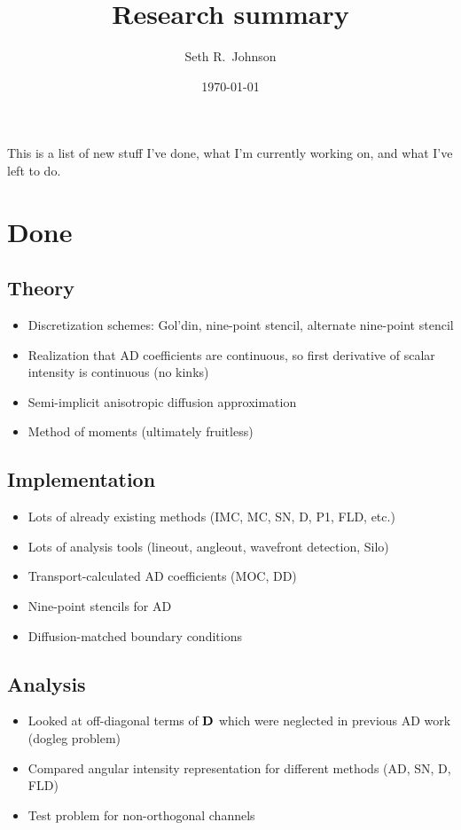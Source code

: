 \documentclass[11pt]{SRJresearch}
\author{Seth R.~Johnson}
\date{\today}
\title{Research summary}
\newcommand{\Dtens}{\mat{D}}
\begin{document}
This is a list of new stuff I've done, what I'm currently working on, and what
I've left to do.

\section{Done}
\subsection{Theory}
\begin{itemize}
  \item Discretization schemes: Gol'din, nine-point stencil, alternate
    nine-point stencil
  \item Realization that AD coefficients are continuous, so first derivative of
    scalar intensity is continuous (no kinks)
  \item Semi-implicit anisotropic diffusion approximation
  \item Method of moments (ultimately fruitless)
\end{itemize}

\subsection{Implementation}
\begin{itemize}
  \item Lots of already existing methods (IMC, MC, SN, D, P1, FLD, etc.)
  \item Lots of analysis tools (lineout, angleout, wavefront detection, Silo)
  \item Transport-calculated AD coefficients (MOC, DD)
  \item Nine-point stencils for AD
  \item Diffusion-matched boundary conditions
\end{itemize}

\subsection{Analysis}
\begin{itemize}
  \item Looked at off-diagonal terms of $\Dtens$ which were neglected in
    previous AD work (dogleg problem)
  \item Compared angular intensity representation for different methods (AD,
    SN, D, FLD)
  \item Test problem for non-orthogonal channels
\end{itemize}
\end{document}

